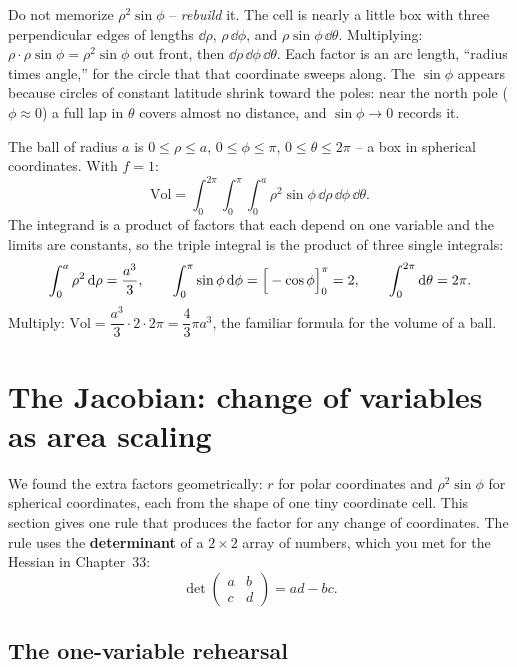 \begin{happeningbox}
Do not memorize $\rho^2\sin\phi$ -- \emph{rebuild} it. The cell is nearly a
little box with three perpendicular edges of lengths $\dd\rho$, $\rho\,\dd\phi$,
and $\rho\sin\phi\,\dd\theta$. Multiplying: $\rho\cdot\rho\sin\phi=\rho^2\sin\phi$
out front, then $\dd\rho\,\dd\phi\,\dd\theta$. Each factor is an arc length,
``radius times angle,'' for the circle that that coordinate sweeps along. The
$\sin\phi$ appears because circles of constant latitude shrink toward the poles:
near the north pole ($\phi\approx 0$) a full lap in $\theta$ covers almost no
distance, and $\sin\phi\to 0$ records it.
\end{happeningbox}

\begin{example}
\label{ch34:ex-ball}
The ball of radius $a$ is $0\le\rho\le a$, $0\le\phi\le\pi$, $0\le\theta\le 2\pi$
-- a box in spherical coordinates. With $f=1$:
\[
  \text{Vol}=\int_0^{2\pi}\!\int_0^{\pi}\!\int_0^a
     \rho^2\sin\phi\,\dd\rho\,\dd\phi\,\dd\theta .
\]
The integrand is a product of factors that each depend on one variable and the
limits are constants, so the triple integral is the product of three single
integrals:
\[
  \int_0^a\rho^2\,\mathrm{d}\rho=\frac{a^3}{3},\qquad
  \int_0^\pi\sin\phi\,\mathrm{d}\phi=\Big[-\cos\phi\Big]_{0}^{\pi}=2,\qquad
  \int_0^{2\pi}\mathrm{d}\theta=2\pi .
\]
Multiply: $\text{Vol}=\dfrac{a^3}{3}\cdot 2\cdot 2\pi=\dfrac{4}{3}\pi a^3$, the
familiar formula for the volume of a ball.
\end{example}

\section{The Jacobian: change of variables as area scaling}
\label{ch34:jacobian}

We found the extra factors geometrically: $r$ for polar coordinates and
$\rho^2\sin\phi$ for spherical coordinates, each from the shape of one tiny
coordinate cell. This section gives one rule that produces the factor for any
change of coordinates. The rule uses the \textbf{determinant} of a $2\times 2$
array of numbers, which you met for the Hessian in Chapter~33:
\[
  \det\begin{pmatrix} a & b\\ c & d\end{pmatrix} = ad-bc .
\]

\subsection{The one-variable rehearsal}

